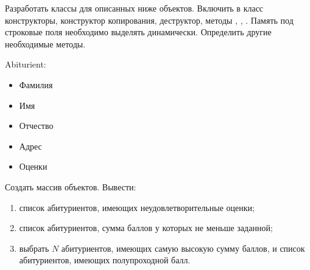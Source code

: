 
Разработать классы для описанных ниже объектов. Включить в класс
конструкторы, конструктор копирования, деструктор, методы ,
, . Память под строковые поля необходимо выделять
динамически. Определить другие необходимые методы.

Abiturient:
\begin{itemize}
	\item Фамилия
	\item Имя
	\item Отчество
	\item Адрес
	\item Оценки
\end{itemize}

Создать массив объектов. Вывести:
\begin{enumerate}
	\item список абитуриентов, имеющих неудовлетворительные оценки;
	\item список абитуриентов, сумма баллов у которых не меньше заданной;
	\item выбрать $N$ абитуриентов, имеющих самую высокую сумму баллов, и
		список абитуриентов, имеющих полупроходной балл.
\end{enumerate}
